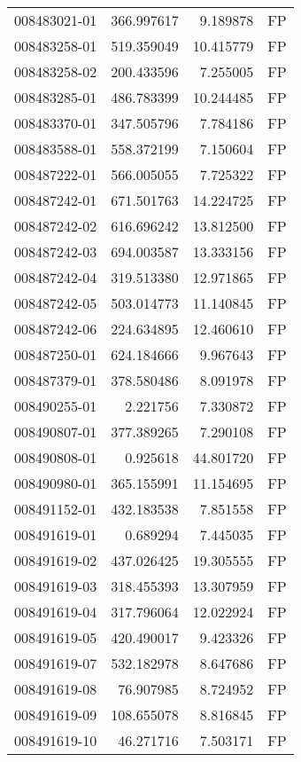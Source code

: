 \begin{tabular}{lrrl}
008483021-01 &  366.997617 &     9.189878 &   FP \\
008483258-01 &  519.359049 &    10.415779 &   FP \\
008483258-02 &  200.433596 &     7.255005 &   FP \\
008483285-01 &  486.783399 &    10.244485 &   FP \\
008483370-01 &  347.505796 &     7.784186 &   FP \\
008483588-01 &  558.372199 &     7.150604 &   FP \\
008487222-01 &  566.005055 &     7.725322 &   FP \\
008487242-01 &  671.501763 &    14.224725 &   FP \\
008487242-02 &  616.696242 &    13.812500 &   FP \\
008487242-03 &  694.003587 &    13.333156 &   FP \\
008487242-04 &  319.513380 &    12.971865 &   FP \\
008487242-05 &  503.014773 &    11.140845 &   FP \\
008487242-06 &  224.634895 &    12.460610 &   FP \\
008487250-01 &  624.184666 &     9.967643 &   FP \\
008487379-01 &  378.580486 &     8.091978 &   FP \\
008490255-01 &    2.221756 &     7.330872 &   FP \\
008490807-01 &  377.389265 &     7.290108 &   FP \\
008490808-01 &    0.925618 &    44.801720 &   FP \\
008490980-01 &  365.155991 &    11.154695 &   FP \\
008491152-01 &  432.183538 &     7.851558 &   FP \\
008491619-01 &    0.689294 &     7.445035 &   FP \\
008491619-02 &  437.026425 &    19.305555 &   FP \\
008491619-03 &  318.455393 &    13.307959 &   FP \\
008491619-04 &  317.796064 &    12.022924 &   FP \\
008491619-05 &  420.490017 &     9.423326 &   FP \\
008491619-07 &  532.182978 &     8.647686 &   FP \\
008491619-08 &   76.907985 &     8.724952 &   FP \\
008491619-09 &  108.655078 &     8.816845 &   FP \\
008491619-10 &   46.271716 &     7.503171 &   FP \\

\end{tabular}
